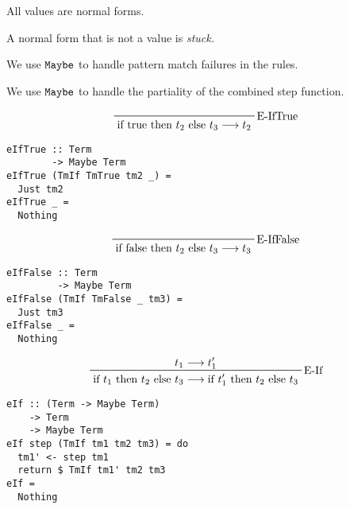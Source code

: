 \documentclass{beamer}
\begin{document}
\begin{frame}[c]
  \begin{center}
All values are normal forms.
  \end{center}
\end{frame}

\begin{frame}[c]
  \begin{center}
A normal form that is not a value is \em{stuck}.
  \end{center}
\end{frame}

\begin{frame}[c]
  \begin{center}
We use $\tt{Maybe}$ to handle pattern match failures in the rules.
  \end{center}
\end{frame}

\begin{frame}[c]
  \begin{center}
We use $\tt{Maybe}$ to handle the partiality of the combined step function.
  \end{center}
\end{frame}

\begin{frame}[fragile]
  \begin{displaymath}
    \prftree[r]{E-IfTrue}
    {\text{if true then $t_2$ else $t_3$} \longrightarrow t_2}
  \end{displaymath}
  \begin{verbatim}
eIfTrue :: Term 
        -> Maybe Term
eIfTrue (TmIf TmTrue tm2 _) =
  Just tm2
eIfTrue _ =
  Nothing
  \end{verbatim}
\end{frame}

\begin{frame}[fragile]
  \begin{displaymath}
    \prftree[r]{E-IfFalse}
    {\text{if false then $t_2$ else $t_3$} \longrightarrow t_3}
  \end{displaymath}
  \begin{verbatim}
eIfFalse :: Term 
         -> Maybe Term
eIfFalse (TmIf TmFalse _ tm3) =
  Just tm3
eIfFalse _ =
  Nothing
  \end{verbatim}
\end{frame}

\begin{frame}[fragile]
  \begin{displaymath}
    \prftree[r]{E-If}
    {t_1 \longrightarrow t_1^{\prime}}
    {\text{if $t_1$ then $t_2$ else $t_3$} \longrightarrow \text{if $t_1^{\prime}$ then $t_2$ else $t_3$}}
  \end{displaymath}
  \begin{verbatim}
eIf :: (Term -> Maybe Term) 
    -> Term 
    -> Maybe Term
eIf step (TmIf tm1 tm2 tm3) = do
  tm1' <- step tm1
  return $ TmIf tm1' tm2 tm3
eIf =
  Nothing
  \end{verbatim}
\end{frame}
\end{document}
